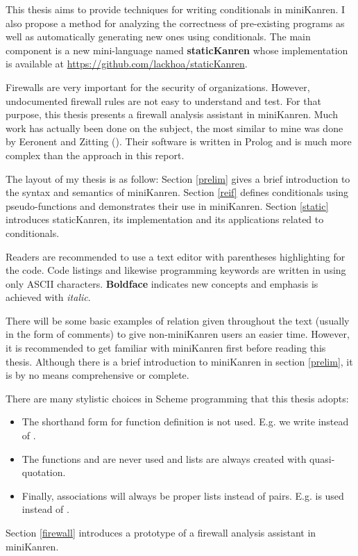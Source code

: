 \ifthesis This thesis aims to provide techniques for writing conditionals in miniKanren. I also propose a method for analyzing the correctness of pre-existing programs as well as automatically generating new ones using conditionals. The main component is a new mini-language named \textbf{staticKanren} whose implementation is available at \url{https://github.com/lackhoa/staticKanren}.

\else Firewalls are very important for the security of organizations. However, undocumented firewall rules are not easy to understand and test. For that purpose, this thesis presents a firewall analysis assistant in miniKanren. Much work has actually been done on the subject, the most similar to mine was done by Eeronent and Zitting (\cite{Eronen2001AnES}). Their software is written in Prolog and is much more complex than the approach in this report.\fi

The layout of my thesis is as follow: Section \ref{prelim} gives a brief introduction to the syntax and semantics of miniKanren.
\ifthesis Section \ref{reif} defines conditionals using pseudo-functions and demonstrates their use in miniKanren. Section \ref{static} introduces staticKanren, its implementation and its applications related to conditionals.

Readers are recommended to use a text editor with parentheses highlighting for the code. Code listings and likewise programming keywords are written in  using only ASCII characters. \textbf{Boldface} indicates new concepts and emphasis is achieved with \textit{italic}.

There will be some basic examples of relation given throughout the text (usually in the form of comments) to give non-miniKanren users an easier time. However, it is recommended to get familiar with miniKanren first before reading this thesis. Although there is a brief introduction to miniKanren in section \ref{prelim}, it is by no means comprehensive or complete.

There are many stylistic choices in Scheme programming that this thesis adopts:
\begin{itemize}
    \item The shorthand form for function definition is not used. E.g. we write  instead of .
    \item The functions  and  are never used and lists are always created with quasi-quotation.
    \item Finally, associations will always be proper lists instead of pairs. E.g. \code{([x 1] [y (a b)])} is used instead of \code{([x 1] [y a b])}.
\end{itemize}

\else Section \ref{firewall} introduces a prototype of a firewall analysis assistant in miniKanren.\fi